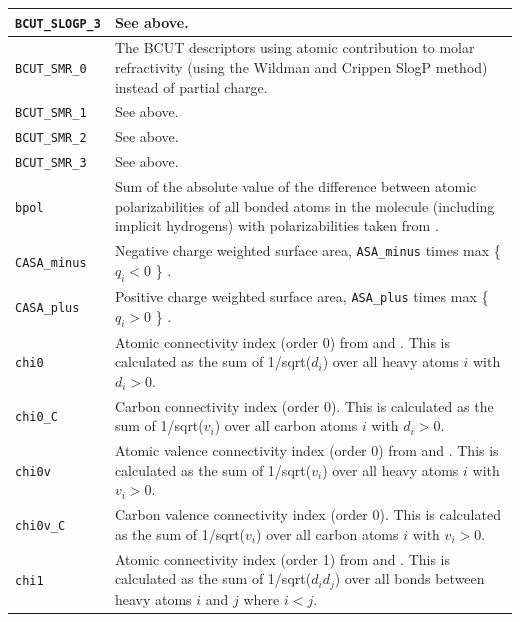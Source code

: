 \documentclass[12pt,a4paper]{article}
\begin{document}
\begin{longtable}{@{\zz}|p{}|p{}|}
\texttt{BCUT\_SLOGP\_3} & See above.\\ \hline

\texttt{BCUT\_SMR\_0} & The BCUT descriptors using atomic contribution to molar 
refractivity (using the Wildman and Crippen SlogP method) instead of partial 
charge.\\ \hline

\texttt{BCUT\_SMR\_1} & See above.\\ \hline

\texttt{BCUT\_SMR\_2} & See above.\\ \hline

\texttt{BCUT\_SMR\_3} & See above.\\ \hline

\texttt{bpol} & Sum of the absolute value of the difference between atomic 
polarizabilities of all bonded atoms in the molecule (including implicit 
hydrogens) with polarizabilities taken from \cite{CRC1994}.\\ \hline

\texttt{CASA\_minus} & Negative charge weighted surface area, \texttt{ASA\_minus} 
times max \{ $q_i < 0$ \} \cite{Stanton1990}.\\ \hline

\texttt{CASA\_plus} & Positive charge weighted surface area, \texttt{ASA\_plus} 
times max \{ $q_i > 0$ \} \cite{Stanton1990}.\\ \hline

\texttt{chi0} & Atomic connectivity index (order 0) from \cite{Hall1991} and 
\cite{Kier1977}. This is calculated as the sum of 1/sqrt($d_i$) over all heavy 
atoms $i$ with $d_i > 0$.\\ \hline

\texttt{chi0\_C} & Carbon connectivity index (order 0). This is 
calculated as the sum of 1/sqrt($v_i$) over all carbon atoms $i$ with 
$d_i > 0$.\\ \hline

\texttt{chi0v} & Atomic valence connectivity index (order 0) from \cite{Hall1991} and 
\cite{Kier1977}. This is calculated as the sum of 1/sqrt($v_i$) over all heavy 
atoms $i$ with $v_i > 0$.\\ \hline

\texttt{chi0v\_C} & Carbon valence connectivity index (order 0). This is 
calculated as the sum of 1/sqrt($v_i$) over all carbon atoms $i$ with 
$v_i > 0$.\\ \hline

\texttt{chi1} & Atomic connectivity index (order 1) from \cite{Hall1991} and 
\cite{Kier1977}. This is calculated as the sum of 1/sqrt($d_id_j$) over all 
bonds between heavy atoms $i$ and $j$ where $i < j$.\\ \hline 


\end{longtable}
\end{document}
